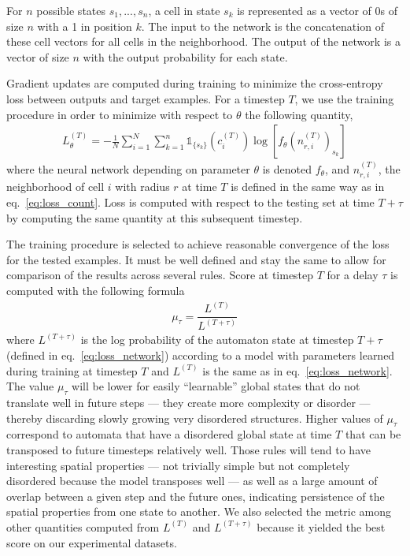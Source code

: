 For $n$ possible states ${s_1, ..., s_n}$, a cell in state $s_k$ is represented
as a vector of 0s of size $n$ with a 1 in position $k$. The input to the network
is the concatenation of these cell vectors for all cells in the neighborhood.
The output of the network is a vector of size $n$ with the output probability
for each state.

Gradient updates are computed during training to minimize the cross-entropy loss
between outputs and target examples. For a timestep $T$, we use the training
procedure in order to minimize with respect to $\theta$ the following quantity,
\begin{align}
  L_\theta^{(T)} = - \frac{1}{N}\sum_{i=1}^N \sum_{k=1}^n
  \mathds{1}_{\{ s_k \}}\left(c_i^{(T)}\right)
  \log\left[f_\theta\left(n_{r,i}^{(T)}\right)_{s_k}\right]
  \label{eq:loss_network}
\end{align}
where the neural network depending on parameter $\theta$ is denoted $f_\theta$,
and $n_{r,i}^{(T)}$, the neighborhood of cell $i$ with radius $r$ at time $T$ is
defined in the same way as in eq.~\eqref{eq:loss_count}. Loss is computed with
respect to the testing set at time $T + \tau$ by computing the same quantity at
this subsequent timestep.

The training procedure is selected to achieve reasonable convergence of the loss
for the tested examples. It must be well defined and stay the same to allow for
comparison of the results across several rules. Score at timestep $T$ for a
delay $\tau$ is computed with the following formula
\begin{align}
  \textstyle \mu_\tau = \dfrac{L^{(T)}}{L^{(T + \tau)}}
  \label{eq:main_metric}
\end{align}
where $L^{(T + \tau)}$ is the log probability of the automaton state at timestep
$T + \tau$ (defined in eq.~\eqref{eq:loss_network}) according to a model with
parameters learned during training at timestep $T$ and $L^{(T)}$ is the same as
in eq.~\eqref{eq:loss_network}. The value $\mu_\tau$ will be lower for easily
``learnable'' global states that do not translate well in future steps --- they
create more complexity or disorder --- thereby discarding slowly growing very
disordered structures. Higher values of $\mu_\tau$ correspond to automata that
have a disordered global state at time $T$ that can be transposed to future
timesteps relatively well. Those rules will tend to have interesting spatial
properties --- not trivially simple but not completely disordered because the
model transposes well --- as well as a large amount of overlap between a given
step and the future ones, indicating persistence of the spatial properties from
one state to another. We also selected the metric among other quantities
computed from $L^{(T)}$ and $L^{(T+\tau)}$ because it yielded the best score on
our experimental datasets.

